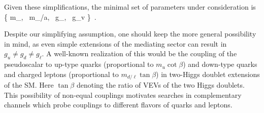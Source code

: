 Given these simplifications, the minimal set of parameters under consideration is
 \bea
  \left\{ m_\chiDM,~ m_{\phi/a},~ g_\chiDM,~ g_v \right\} \,.
 \eea

Despite our simplifying assumption, one should keep the more general possibility in mind, as even simple extensions of the mediating sector can result in $g_u \neq g_d \neq g_\ell$. A well-known realization of this would be the coupling of the pseudoscalar to up-type quarks (proportional to $m_u \cot\beta$) and down-type quarks and charged leptons (proportional to $m_{d/\ell}\tan\beta$) in two-Higgs doublet extensions of the SM. Here $\tan \beta$ denoting the ratio of VEVs of the two Higgs doublets. %
This possibility of non-equal couplings motivates searches in complementary channels which probe couplings to different flavors of quarks and leptons.




